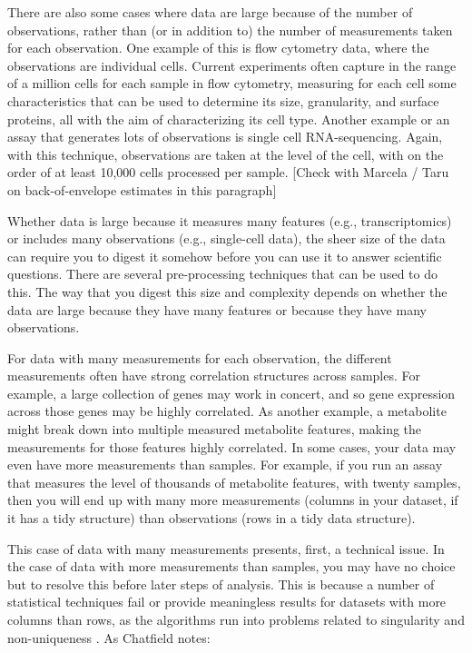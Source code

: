 \documentclass[]{tufte-book}
\begin{document}
There are also some cases where data are large because of the number of
observations, rather than (or in addition to) the number of measurements taken
for each observation. One example of this is flow cytometry data, where the
observations are individual cells. Current experiments often capture in the
range of a million cells for each sample in flow cytometry, measuring for each
cell some characteristics that can be used to determine its size, granularity,
and surface proteins, all with the aim of characterizing its cell type. Another
example or an assay that generates lots of observations is single cell
RNA-sequencing. Again, with this technique, observations are taken at the level
of the cell, with on the order of at least 10,000 cells processed per sample.
{[}Check with Marcela / Taru on back-of-envelope estimates in this paragraph{]}

Whether data is large because it measures many features (e.g., transcriptomics)
or includes many observations (e.g., single-cell data), the sheer size of the
data can require you to digest it somehow before you can use it to answer
scientific questions. There are several pre-processing techniques that can be
used to do this. The way that you digest this size and complexity depends on
whether the data are large because they have many features or because they have
many observations.

For data with many measurements for each observation, the different measurements
often have strong correlation structures across samples. For example, a large
collection of genes may work in concert, and so gene expression across those
genes may be highly correlated. As another example, a metabolite might break
down into multiple measured metabolite features, making the measurements for
those features highly correlated. In some cases, your data may even have more
measurements than samples. For example, if you run an assay that measures the
level of thousands of metabolite features, with twenty samples, then you will
end up with many more measurements (columns in your dataset, if it has a tidy
structure) than observations (rows in a tidy data structure).

This case of data with many measurements presents, first, a technical issue. In
the case of data with more measurements than samples, you may have no choice but
to resolve this before later steps of analysis. This is because a number of
statistical techniques fail or provide meaningless results for datasets with
more columns than rows, as the algorithms run into problems
related to singularity and non-uniqueness \citep{chatfield1995problem}. As Chatfield
notes:
\end{document}
